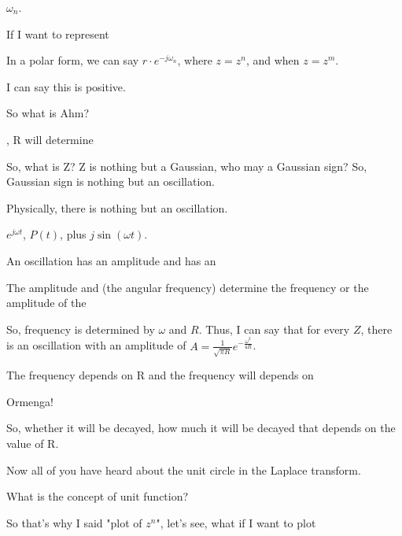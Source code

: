 \documentclass{article}
\begin{document}
$\omega_n$.

If I want to represent

In a polar form, we can say $r \cdot e^{-j\omega_n}$, where $z = z^n$, and when $z = z^m$.

I can say this is positive.



So what is Ahm?

, R will determine

So, what is Z? Z is nothing but a Gaussian, who may a Gaussian sign? So, Gaussian sign is nothing but an oscillation.



Physically, there is nothing but an oscillation.

$e^{j\omega t}$, $P(t)$, plus $j \sin(\omega t)$.



An oscillation has an amplitude and has an

The amplitude and \omega (the angular frequency) determine the frequency or the amplitude of the







So, frequency is determined by $\omega$ and $R$. Thus, I can say that for every $Z$, there is an oscillation with an amplitude of $A = \frac{1}{\sqrt{\pi R}}e^{-\frac{\omega^2}{4R}}$.

The frequency depends on R and the frequency will depends on

Ormenga!



So, whether it will be decayed, how much it will be decayed that depends on the value of R.



Now all of you have heard about the unit circle in the Laplace transform.

What is the concept of unit function?

So that's why I said "plot of $z^n$", let's see, what if I want to plot
\end{document}
